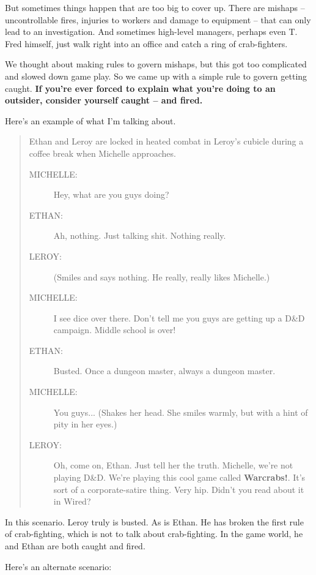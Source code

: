 \documentclass[a4paper,10pt]{article}
\newcommand{\warcrabs}{\textbf{Warcrabs!}}
\begin{document}
But sometimes things happen that are too big to cover up. There are mishaps -- uncontrollable fires, injuries to workers and damage to equipment -- that can only lead to an investigation. And sometimes high-level managers, perhaps even T. Fred himself, just walk right into an office and catch a ring of crab-fighters.

We thought about making rules to govern mishaps, but this got too complicated and slowed down game play. So we came up with a simple rule to govern getting caught. \textbf{If you're ever forced to explain what you're doing to an outsider, consider yourself caught -- and fired.}

Here's an example of what I'm talking about.

\begin{quote}
Ethan and Leroy are locked in heated combat in Leroy's cubicle during a coffee break when Michelle approaches.
\begin{description}
 \item[MICHELLE:]Hey, what are you guys doing?
 \item[ETHAN:]Ah, nothing. Just talking shit. Nothing really.
 \item[LEROY:](Smiles and says nothing. He really, really likes Michelle.)
 \item[MICHELLE:]I see dice over there. Don't tell me you guys are getting up a D\&D campaign. Middle school is over!
 \item[ETHAN:]Busted. Once a dungeon master, always a dungeon master.
 \item[MICHELLE:]You guys... (Shakes her head. She smiles warmly, but with a hint of pity in her eyes.)
 \item[LEROY:]Oh, come on, Ethan. Just tell her the truth. Michelle, we're not playing D\&D. We're playing this cool game called \warcrabs. It's sort of a corporate-satire thing. Very hip. Didn't you read about it in Wired?
 \end{description}
\end{quote}

In this scenario. Leroy truly is busted. As is Ethan. He has broken the first rule of crab-fighting, which is not to talk about crab-fighting. In the game world, he and Ethan are both caught and fired.

Here's an alternate scenario:
\end{document}
